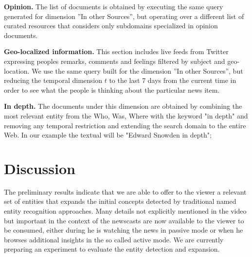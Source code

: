 \documentclass{llncs}
\begin{document}
\textbf{Opinion.} The list of documents is obtained by executing the same query generated for dimension ''In other Sources'', but operating over a different list of curated resources that considers only subdomains specialized in opinion documents.

\textbf{Geo-localized information.} This section includes live feeds from Twitter expressing peoples remarks, comments and feelings filtered by subject and geo-location. We use the same query built for the dimension ''In other Sources'', but reducing the temporal dimension $t$ to the last 7 days from the current time in order to see what the people is thinking about the particular news item.

\textbf{In depth.} The documents under this dimension are obtained by combining the most relevant entity from the Who, Was, Where with the keyword "in depth" and removing any temporal restriction and extending the search domain to the entire Web. In our example the textual will be "Edward Snowden in depth";
		

\section{Discussion}
\label{sec:discussion}
The preliminary results indicate that we are able to offer to the viewer a relevant set of entities that expands the initial concepts detected by traditional named entity recognition approaches. Many details not explicitly mentioned in the video but important in the context of the newscasts are now available to the viewer to be consumed, either during he is watching the news in passive mode or when he browses additional insights in the so called active mode. We are currently preparing an experiment to evaluate the entity detection and expansion.

\end{document}
